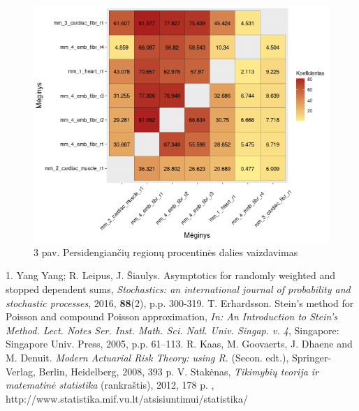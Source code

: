 \documentclass[12pt]{article}
\begin{document}
\newpage



\begin{figure}[htb]
    \begin{center}
        \includegraphics[width=0.8\linewidth]{Figures/peak_overlaps_between_samples.png}
        \caption*{3 pav. Persidengiančių regionų procentinės dalies vaizdavimas}
    \end{center}
\end{figure}

\newpage



\begin{thebibliography}{99}

1. Yang Yang; R. Leipus, J. \v{S}iaulys. Asymptotics for randomly weighted and stopped dependent sums, \emph{Stochastics: an international journal of probability and stochastic processes}, 2016, \textbf{88}(2), p.p. 300-319.
  T. Erhardsson. Stein’s method for Poisson and compound Poisson approximation, \emph{In: An Introduction to Stein’s Method. Lect. Notes Ser. Inst. Math. Sci. Natl. Univ. Singap. v. 4}, Singapore: Singapore Univ. Press, 2005, p.p. 61–113.
 R. Kaas, M. Goovaerts, J. Dhaene  and M. Denuit. \emph{Modern Actuarial Risk Theory:
using R.} (Secon. edt.), Springer-Verlag, Berlin, Heidelberg,  2008, 393 p.
 V. Stakėnas, \emph{Tikimybių teorija ir matematinė statistika} (rankraštis), 2012, 178 p. , http://www.statistika.mif.vu.lt/atsisiuntimui/statistika/

\end{thebibliography}
\newpage
\end{document}
